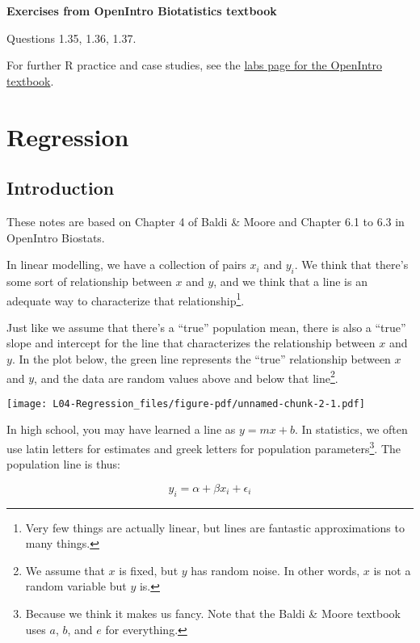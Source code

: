 \documentclass[
  letterpaper,
  DIV=11,
  numbers=noendperiod]{scrreprt}
\begin{document}
\textbf{Exercises from OpenIntro Biotatistics textbook}

Questions 1.35, 1.36, 1.37.

For further R practice and case studies, see the
\href{https://www.openintro.org/book/statlabs/?labblock=biostat_intro_to_data}{labs
page for the OpenIntro textbook}.

\hypertarget{regression}{%
\chapter{Regression}\label{regression}}

\hypertarget{introduction-2}{%
\section{Introduction}\label{introduction-2}}

These notes are based on Chapter 4 of Baldi \& Moore and Chapter 6.1 to
6.3 in OpenIntro Biostats.

In linear modelling, we have a collection of pairs \(x_i\) and \(y_i\).
We think that there's some sort of relationship between \(x\) and \(y\),
and we think that a line is an adequate way to characterize that
relationship\footnote{Very few things are actually linear, but lines are
  fantastic approximations to many things.}.

Just like we assume that there's a ``true'' population mean, there is
also a ``true'' slope and intercept for the line that characterizes the
relationship between \(x\) and \(y\). In the plot below, the green line
represents the ``true'' relationship between \(x\) and \(y\), and the
data are random values above and below that line\footnote{We assume that
  \(x\) is fixed, but \(y\) has random noise. In other words, \(x\) is
  not a random variable but \(y\) is.}.

\texttt{[image: L04-Regression\_files/figure-pdf/unnamed-chunk-2-1.pdf]}

In high school, you may have learned a line as \(y = mx + b\). In
statistics, we often use latin letters for estimates and greek letters
for population parameters\footnote{Because we think it makes us fancy.
  Note that the Baldi \& Moore textbook uses \(a\), \(b\), and \(e\) for
  everything.}. The population line is thus:

\[
y_i = \alpha + \beta x_i + \epsilon_i
\]
\end{document}

